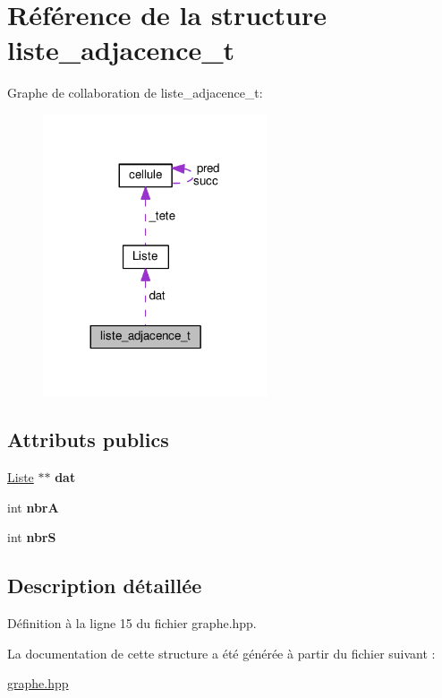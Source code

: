\hypertarget{structliste__adjacence__t}{\section{Référence de la structure liste\+\_\+adjacence\+\_\+t}
\label{structliste__adjacence__t}
}


Graphe de collaboration de liste\+\_\+adjacence\+\_\+t\+:\nopagebreak
\begin{figure}[H]
\begin{center}
\leavevmode
\includegraphics[width=188pt]{structliste__adjacence__t__coll__graph}
\end{center}
\end{figure}
\subsection*{Attributs publics}
\begin{DoxyCompactItemize}
\item 
\hypertarget{structliste__adjacence__t_aa2ce2755fe745acafa83b31ef058e2bf}{\hyperlink{classListe}{Liste} $\ast$$\ast$ {\bfseries dat}}\label{structliste__adjacence__t_aa2ce2755fe745acafa83b31ef058e2bf}

\item 
\hypertarget{structliste__adjacence__t_a9eb23de3f625a350ee1eec6f7384c8ab}{int {\bfseries nbr\+A}}\label{structliste__adjacence__t_a9eb23de3f625a350ee1eec6f7384c8ab}

\item 
\hypertarget{structliste__adjacence__t_a2b1c14efef06ec98f7c600dc74bb85ca}{int {\bfseries nbr\+S}}\label{structliste__adjacence__t_a2b1c14efef06ec98f7c600dc74bb85ca}

\end{DoxyCompactItemize}


\subsection{Description détaillée}


Définition à la ligne 15 du fichier graphe.\+hpp.



La documentation de cette structure a été générée à partir du fichier suivant \+:\begin{DoxyCompactItemize}
\item 
\hyperlink{graphe_8hpp}{graphe.\+hpp}\end{DoxyCompactItemize}
